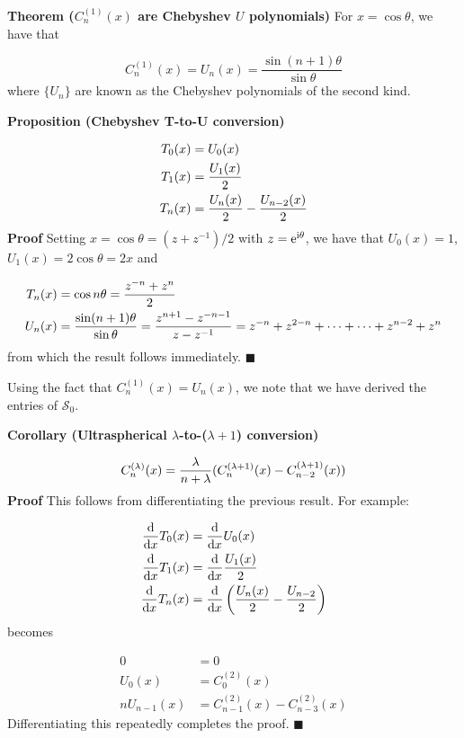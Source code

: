 \documentclass[12pt,a4paper]{article}
\begin{document}
\textbf{Theorem ($C^{(1)}_n(x)$ are Chebyshev $U$ polynomials)} For $x = \cos \theta$, we have that

\[
C_n^{(1)}(x) = U_n(x) = \frac{\sin (n+1)\theta}{\sin\theta}
\]
where $\{ U_n \}$ are known as the Chebyshev polynomials of the second kind.

\textbf{Proposition (Chebyshev T-to-U conversion)}


\begin{align*}
 T_0(x) &= U_0(x) \\
 T_1(x) &= {U_1(x) \over 2} \\
 T_n(x) &= {U_n(x) \over 2} - {U_{n-2}(x) \over 2}
\end{align*}
\textbf{Proof} Setting $x =\cos \theta = (z + z^{-1})/2$ with $z = {\rm e}^{{\rm i} \theta}$, we have that $U_0(x) = 1$, $U_1(x) = 2\cos\theta = 2x$ and


\begin{align*}
T_n(x) &= \cos n \theta = {z^{-n} + z^n \over 2}\\
U_n(x) &= {\sin (n+1) \theta \over \sin \theta} = {z^{n+1} - z^{-n-1} \over z - z^{-1}} = z^{-n} + z^{2-n} + \cdots +  \cdots + z^{n-2} + z^n
\end{align*}
from which the result follows immediately.  $\blacksquare$

Using the fact that $C_n^{(1)}(x) = U_n(x)$, we note that we have derived the entries of $\mathcal{S}_0$.

\textbf{Corollary (Ultraspherical $\lambda$-to-($\lambda+1$) conversion)}

\[
C_n^{(\lambda)}(x) = {\lambda \over n+ \lambda} (C_n^{(\lambda+1)}(x) - C_{n-2}^{(\lambda+1)}(x))
\]
\textbf{Proof} This follows from differentiating the previous result. For example:


\begin{align*}
 {{\rm d} \over {\rm d}x} T_0(x) &= {{\rm d} \over {\rm d}x} U_0(x) \\
 {{\rm d} \over {\rm d}x} T_1(x) &= {{\rm d} \over {\rm d}x} {U_1(x) \over 2} \\
{{\rm d} \over {\rm d}x} T_n(x) &= {{\rm d} \over {\rm d}x} \left({U_n(x) \over 2} - {U_{n-2} \over 2} \right)
\end{align*}
becomes


\begin{align*}
    0 &= 0\\
    U_0(x) &= C_0^{(2)}(x) \\
   n U_{n-1}(x) &= C_{n-1}^{(2)}(x)  - C_{n-3}^{(2)}(x)
\end{align*}
Differentiating this repeatedly completes the proof. $\blacksquare$
\end{document}
